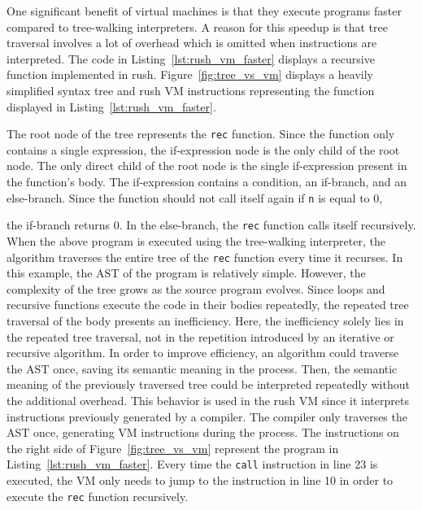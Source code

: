 One significant benefit of virtual machines is that they execute programs faster compared to tree-walking interpreters.
A reason for this speedup is that tree traversal involves a lot of overhead which is omitted when instructions are interpreted.
The code in Listing~\ref{lst:rush_vm_faster} displays a recursive function implemented in rush.
Figure~\ref{fig:tree_vs_vm} displays a heavily simplified syntax tree and rush VM instructions representing the function displayed in Listing~\ref{lst:rush_vm_faster}.

The root node of the tree represents the \texttt{rec} function.
Since the function only contains a single expression, the if-expression node is the only child of the root node.
The only direct child of the root node is the single if-expression present in the function's body.
The if-expression contains a condition, an if-branch, and an else-branch.
Since the function should not call itself again if \texttt{n} is equal to 0,%
\setlength\parfillskip{0pt}\setlength\parskip{0pt}\par\setlength{}
\noindent
\setlength\parskip{\parskipLen}
the if-branch returns 0.
In the else-branch, the \texttt{rec} function calls itself recursively.
When the above program is executed using the tree-walking interpreter, the algorithm traverses the entire tree of the \texttt{rec} function every time it recurses.
In this example, the AST of the program is relatively simple.
However, the complexity of the tree grows as the source program evolves.
Since loops and recursive functions execute the code in their bodies repeatedly, the repeated tree traversal of the body presents an inefficiency.
Here, the inefficiency solely lies in the repeated tree traversal, not in the repetition introduced by an iterative or recursive algorithm.
In order to improve efficiency, an algorithm could traverse the AST once, saving its semantic meaning in the process.
Then, the semantic meaning of the previously traversed tree could be interpreted repeatedly without the additional overhead.
This behavior is used in the rush VM since it interprets instructions previously generated by a compiler.
The compiler only traverses the AST once, generating VM instructions during the process.
The instructions on the right side of Figure~\ref{fig:tree_vs_vm} represent the program in Listing~\ref{lst:rush_vm_faster}.
Every time the \texttt{call} instruction in line 23 is executed, the VM only needs to jump to the instruction in line 10 in order to execute the \texttt{rec} function recursively.
